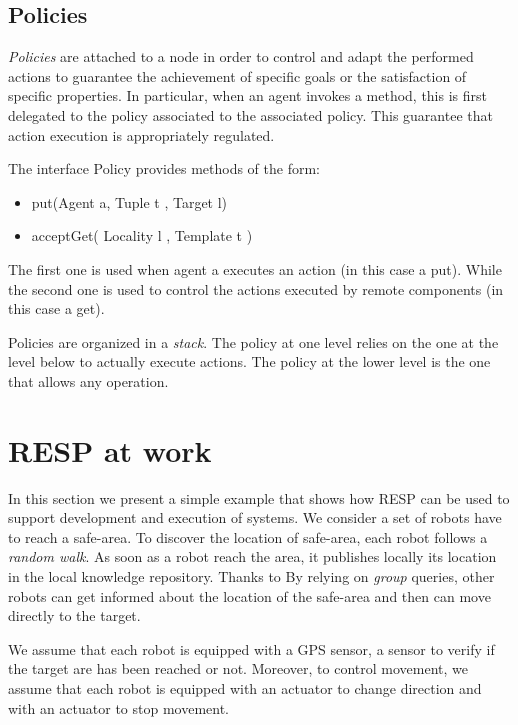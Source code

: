 \documentclass[11pt]{article}
\newcommand{\resp}{\textsf{RESP}}
\begin{document}
\subsection{Policies}
\label{sec:policies}

\emph{Policies} are attached to a node in order to control and adapt the performed actions to guarantee the achievement of specific 
goals or the satisfaction of specific properties. In particular, when an agent invokes a method, this is first delegated to the policy 
associated to the associated policy. This guarantee that \SCEL{} action execution is appropriately regulated.

The interface \textsf{Policy} provides methods of the form:
\begin{itemize}
\item \textsf{put(Agent a, Tuple t , Target l)}
\item \textsf{acceptGet( Locality l , Template t )}
\end{itemize}

The first one is used when agent \textsf{a} executes an action (in this case a \textsf{put}). While the second one is
used  to control the actions executed by remote components (in this case a \textsf{get}).

Policies are organized in a \emph{stack}. The policy at one level relies on the one at the level below to
actually execute \SCEL{} actions. The policy at the lower level is the one that allows any operation.


\section{\resp{} at work}
\label{sec:atwork}

In this section we present a simple example that shows how \resp{} can be used to
support development and execution of \SCEL{} systems.
%
We consider a set of robots have to reach a safe-area.  To discover the location of safe-area, 
each robot follows a \emph{random walk}. As soon as a robot reach the area, it publishes locally its location 
in the local knowledge repository. Thanks to By relying on \emph{group} queries, other robots can get informed 
about the location of the safe-area and then can move directly to the target.

We assume that each robot is equipped with  a GPS sensor, 
a sensor to verify if the target are has been reached or not. Moreover, to control
 movement, we assume that each robot is equipped with an actuator to change direction
 and with an actuator to stop movement.
 
\end{document}
